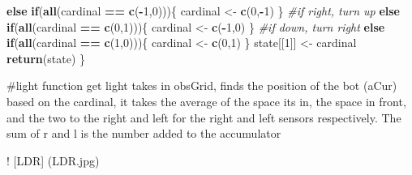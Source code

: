 \documentclass[]{article}
\newenvironment{Shaded}{\begin{snugshade}}{\end{snugshade}}
\newcommand{\CommentTok}[1]{\textcolor[rgb]{0.56,0.35,0.01}{\textit{#1}}}
\newcommand{\ControlFlowTok}[1]{\textcolor[rgb]{0.13,0.29,0.53}{\textbf{#1}}}
\newcommand{\DecValTok}[1]{\textcolor[rgb]{0.00,0.00,0.81}{#1}}
\newcommand{\KeywordTok}[1]{\textcolor[rgb]{0.13,0.29,0.53}{\textbf{#1}}}
\newcommand{\NormalTok}[1]{#1}
\newcommand{\OperatorTok}[1]{\textcolor[rgb]{0.81,0.36,0.00}{\textbf{#1}}}
\newcommand{\StringTok}[1]{\textcolor[rgb]{0.31,0.60,0.02}{#1}}
\begin{document}
\begin{Shaded}
\begin{Highlighting}[]
  \ControlFlowTok{else} \ControlFlowTok{if}\NormalTok{(}\KeywordTok{all}\NormalTok{(cardinal }\OperatorTok{==}\StringTok{ }\KeywordTok{c}\NormalTok{(}\OperatorTok{-}\DecValTok{1}\NormalTok{,}\DecValTok{0}\NormalTok{)))\{}
\NormalTok{    cardinal <-}\StringTok{ }\KeywordTok{c}\NormalTok{(}\DecValTok{0}\NormalTok{,}\OperatorTok{-}\DecValTok{1}\NormalTok{)}
\NormalTok{  \}}
  \CommentTok{#if right, turn up}
  \ControlFlowTok{else} \ControlFlowTok{if}\NormalTok{(}\KeywordTok{all}\NormalTok{(cardinal }\OperatorTok{==}\StringTok{ }\KeywordTok{c}\NormalTok{(}\DecValTok{0}\NormalTok{,}\DecValTok{1}\NormalTok{)))\{}
\NormalTok{    cardinal <-}\StringTok{ }\KeywordTok{c}\NormalTok{(}\OperatorTok{-}\DecValTok{1}\NormalTok{,}\DecValTok{0}\NormalTok{)}
\NormalTok{  \}}
   \CommentTok{#if down, turn right}
  \ControlFlowTok{else} \ControlFlowTok{if}\NormalTok{(}\KeywordTok{all}\NormalTok{(cardinal }\OperatorTok{==}\StringTok{ }\KeywordTok{c}\NormalTok{(}\DecValTok{1}\NormalTok{,}\DecValTok{0}\NormalTok{)))\{}
\NormalTok{    cardinal <-}\StringTok{ }\KeywordTok{c}\NormalTok{(}\DecValTok{0}\NormalTok{,}\DecValTok{1}\NormalTok{)}
\NormalTok{  \}}
\NormalTok{  state[[}\DecValTok{1}\NormalTok{]] <-}\StringTok{ }\NormalTok{cardinal}
  \KeywordTok{return}\NormalTok{(state)}
\NormalTok{\}}
\end{Highlighting}
\end{Shaded}

\#light function get light takes in obsGrid, finds the position of the
bot (aCur) based on the cardinal, it takes the average of the space its
in, the space in front, and the two to the right and left for the right
and left sensors respectively. The sum of r and l is the number added to
the accumulator

! {[}LDR{]} (LDR.jpg)
\end{document}
